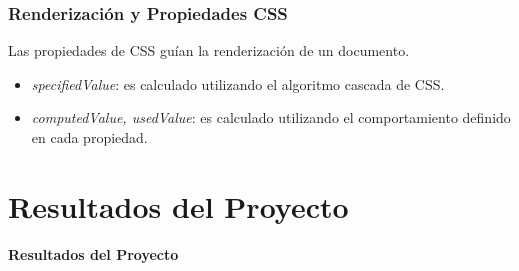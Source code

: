 \documentclass[12pt]{beamer}
\begin{document}
\begin{frame}
\frametitle{Renderización y Propiedades CSS}
Las propiedades de CSS guían la renderización de un documento.

\begin{figure}
\end{figure}

\begin{itemize}
	\item \textit{specifiedValue}: es calculado utilizando el algoritmo cascada de CSS.
	\item \textit{computedValue, usedValue}: es calculado utilizando el comportamiento
	definido en cada propiedad.
\end{itemize}
\end{frame}


\section[Resultados]{Resultados del Proyecto}

\begin{frame}
\begin{center}
	\textbf{\Large Resultados del Proyecto}
\end{center}
\end{frame}
\end{document}
